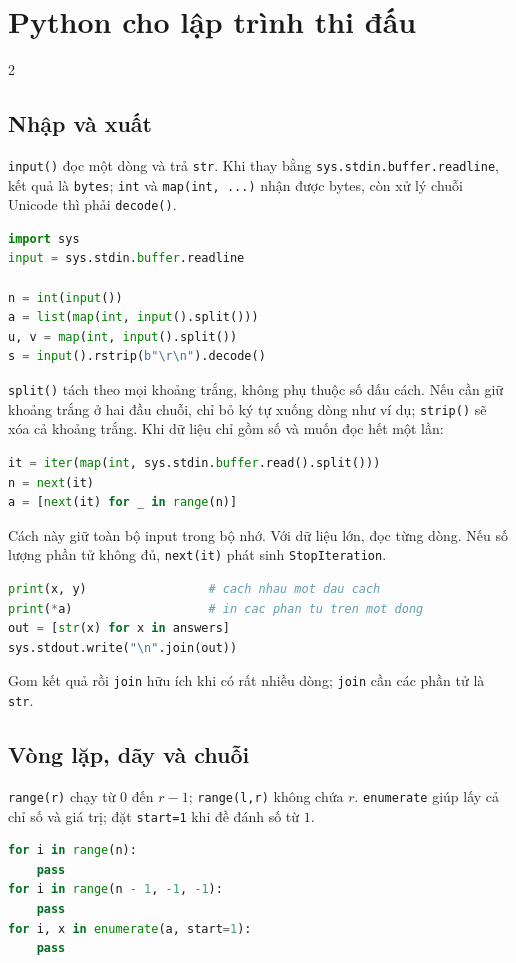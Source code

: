\clearpage
\section{Python cho lập trình thi đấu}
\begingroup\small
\lstset{aboveskip=2pt,belowskip=2pt}
\begin{multicols}{2}

\subsection{Nhập và xuất}
\texttt{input()} đọc một dòng và trả \texttt{str}. Khi thay bằng
\texttt{sys.stdin.buffer.readline}, kết quả là \texttt{bytes};
\texttt{int} và \texttt{map(int, ...)} nhận được bytes, còn xử lý
chuỗi Unicode thì phải \texttt{decode()}.
\begin{lstlisting}[language=Python]
import sys
input = sys.stdin.buffer.readline

n = int(input())
a = list(map(int, input().split()))
u, v = map(int, input().split())
s = input().rstrip(b"\r\n").decode()
\end{lstlisting}
\texttt{split()} tách theo mọi khoảng trắng, không phụ thuộc số dấu
cách. Nếu cần giữ khoảng trắng ở hai đầu chuỗi, chỉ bỏ ký tự xuống
dòng như ví dụ; \texttt{strip()} sẽ xóa cả khoảng trắng.
Khi dữ liệu chỉ gồm số và muốn đọc hết một lần:
\begin{lstlisting}[language=Python]
it = iter(map(int, sys.stdin.buffer.read().split()))
n = next(it)
a = [next(it) for _ in range(n)]
\end{lstlisting}
Cách này giữ toàn bộ input trong bộ nhớ. Với dữ liệu lớn, đọc
từng dòng. Nếu số lượng phần tử không đủ, \texttt{next(it)}
phát sinh \texttt{StopIteration}.

\begin{lstlisting}[language=Python]
print(x, y)                 # cach nhau mot dau cach
print(*a)                   # in cac phan tu tren mot dong
out = [str(x) for x in answers]
sys.stdout.write("\n".join(out))
\end{lstlisting}
Gom kết quả rồi \texttt{join} hữu ích khi có rất nhiều dòng;
\texttt{join} cần các phần tử là \texttt{str}.

\subsection{Vòng lặp, dãy và chuỗi}
\texttt{range(r)} chạy từ $0$ đến $r-1$;
\texttt{range(l,r)} không chứa $r$. \texttt{enumerate} giúp lấy cả
chỉ số và giá trị; đặt \texttt{start=1} khi đề đánh số từ $1$.
\begin{lstlisting}[language=Python]
for i in range(n):
    pass
for i in range(n - 1, -1, -1):
    pass
for i, x in enumerate(a, start=1):
    pass


\end{lstlisting}
\end{multicols}
